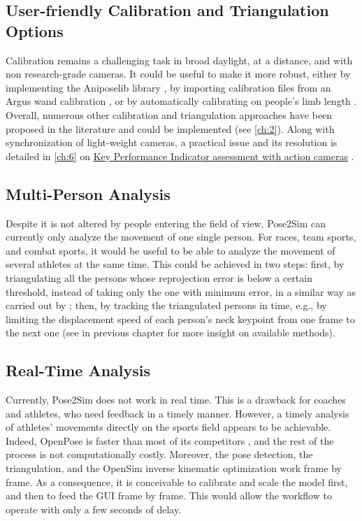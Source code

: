 \subsection{User-friendly Calibration and Triangulation Options}

Calibration remains a challenging task in broad daylight, at a distance, and with non research-grade cameras. It could be useful to make it more robust, either by implementing the Aniposelib library \cite{Karashchuk2020}, by importing calibration files from an Argus wand calibration \cite{Argus}, or by automatically calibrating on people’s limb length \cite{Liu2022a}. Overall, numerous other calibration and triangulation approaches have been proposed in the literature and could be implemented (see \autoref{ch:2}). Along with synchronization of light-weight cameras, a practical issue and its resolution is detailed in \autoref{ch:6} on \hyperref[ch:6]{Key Performance Indicator assessment with action cameras} \cite{Pagnon2022c}. 


\subsection{Multi-Person Analysis}

Despite it is not altered by people entering the field of view, Pose2Sim can currently only analyze the movement of one single person. For races, team sports, and combat sports, it would be useful to be able to analyze the movement of several athletes at the same time. This could be achieved in two steps: first, by triangulating all the persons whose reprojection error is below a certain threshold, instead of taking only the one with minimum error, in a similar way as carried out by \cite{Slembrouck2020}; then, by tracking the triangulated persons in time, e.g., by limiting the displacement speed of each person’s neck keypoint from one frame to the next one (see  in previous chapter for more insight on available methods). 


\subsection{Real-Time Analysis}\label{subsec:realtime}

Currently, Pose2Sim does not work in real time. This is a drawback for coaches and athletes, who need feedback in a timely manner. However, a timely analysis of athletes’ movements directly on the sports field appears to be achievable. Indeed, OpenPose is faster than most of its competitors \cite{Chen2020a}, and the rest of the process is not computationally costly. Moreover, the pose detection, the triangulation, and the OpenSim inverse kinematic optimization work frame by frame. As a consequence, it is conceivable to calibrate and scale the model first, and then to feed the GUI frame by frame. This would allow the workflow to operate with only a few seconds of delay.


